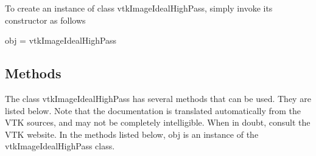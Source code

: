 To create an instance of class vtk\-Image\-Ideal\-High\-Pass, simply invoke its constructor as follows \begin{DoxyVerb}  obj = vtkImageIdealHighPass
\end{DoxyVerb}
 \hypertarget{vtkwidgets_vtkxyplotwidget_Methods}{}\subsection{Methods}\label{vtkwidgets_vtkxyplotwidget_Methods}
The class vtk\-Image\-Ideal\-High\-Pass has several methods that can be used. They are listed below. Note that the documentation is translated automatically from the V\-T\-K sources, and may not be completely intelligible. When in doubt, consult the V\-T\-K website. In the methods listed below, {\ttfamily obj} is an instance of the vtk\-Image\-Ideal\-High\-Pass class. 
